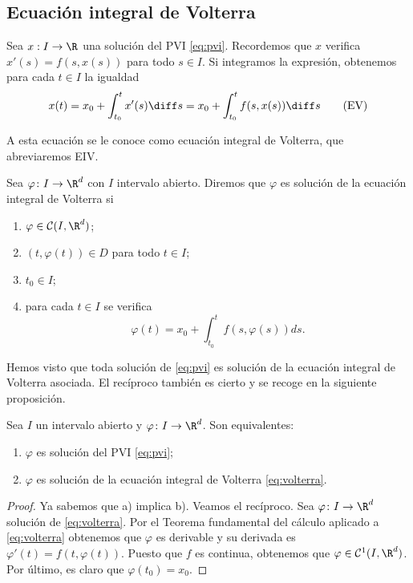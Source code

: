 \documentclass{article}
\begin{document}
\subsection{Ecuación integral de Volterra}

Sea $x: I \to \R$ una solución del PVI \eqref{eq:pvi}.  Recordemos que $x$ verifica
$x'(s) = f(s,x(s))$ para todo $s \in I$. Si integramos la expresión, obtenemos para cada $t \in I$
la igualdad
\begin{equation}
  \label{eq:volterra}
  x(t) = x_0 + \int_{t_0}^t x'(s) \diff s = x_0 + \int_{t_0}^tf(s,x(s)) \diff s
  \tag{EV}
\end{equation}

A esta ecuación se le conoce como ecuación integral de Volterra, que abreviaremos EIV.

\begin{definition}
  Sea $\varphi \colon I \to \R^d$ con $I$ intervalo abierto. Diremos que $\varphi$ es solución de la
  ecuación integral de Volterra si

  \begin{enumerate}
  \item $\varphi \in \mathcal{C}(I, \R^d)$;
  \item $(t, \varphi(t)) \in D$ para todo $t \in I$;
  \item $t_0 \in I$;
  \item para cada $t \in I$ se verifica
    \[\varphi(t) = x_0 + \displaystyle\int_{t_0}^t f(s, \varphi(s))ds.\]
  \end{enumerate}
\end{definition}

Hemos visto que toda solución de \eqref{eq:pvi} es solución de la ecuación integral de Volterra
asociada. El recíproco también es cierto y se recoge en la siguiente proposición.

\begin{proposition}
  Sea $I$ un intervalo abierto y $\varphi \colon I \to \R^d$. Son equivalentes:
  \begin{enumerate}
  \item $\varphi$ es solución del PVI \eqref{eq:pvi};
  \item $\varphi$ es solución de la ecuación integral de Volterra \eqref{eq:volterra}.
  \end{enumerate}
\end{proposition}
\begin{proof}
  Ya sabemos que a) implica b). Veamos el recíproco. Sea $\varphi \colon I \to \R^d$ solución de
  \eqref{eq:volterra}.  Por el Teorema fundamental del cálculo aplicado a \eqref{eq:volterra}
  obtenemos que $\varphi$ es derivable y su derivada es $\varphi'(t) = f(t, \varphi(t))$. Puesto que
  $f$ es continua, obtenemos que $\varphi \in \mathcal{C}^1(I, \R^d)$. Por último, es claro que
  $\varphi(t_0) = x_0$.
\end{proof}
\end{document}
